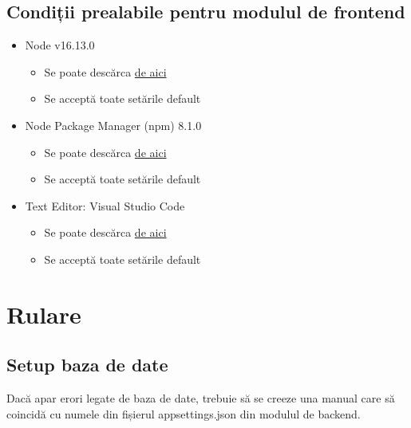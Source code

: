 \subsection{Condiții prealabile pentru modulul de frontend}
\begin{itemize}
    \setlength\itemsep{0.5em}
    \item Node v16.13.0
    \begin{itemize}
        \setlength\itemsep{0.5em}
        \item Se poate descărca \href{https://nodejs.org/en/download/}{\color{blue}de aici}
        \item Se acceptă toate setările default
    \end{itemize}
    \item Node Package Manager (npm) 8.1.0
    \begin{itemize}
        \setlength\itemsep{0.5em}
        \item Se poate descărca \href{https://nodejs.org/en/download/}{\color{blue}de aici}
        \item Se acceptă toate setările default
    \end{itemize}
    \item Text Editor: Visual Studio Code
    \begin{itemize}
        \setlength\itemsep{0.5em}
        \item Se poate descărca \href{https://code.visualstudio.com/download}{\color{blue}de aici}
        \item Se acceptă toate setările default
    \end{itemize}
\end{itemize}

\section{Rulare}
\subsection{Setup baza de date}
Dacă apar erori legate de baza de date, trebuie să se creeze una manual care să coincidă cu numele din fișierul appsettings.json din modulul de backend.
